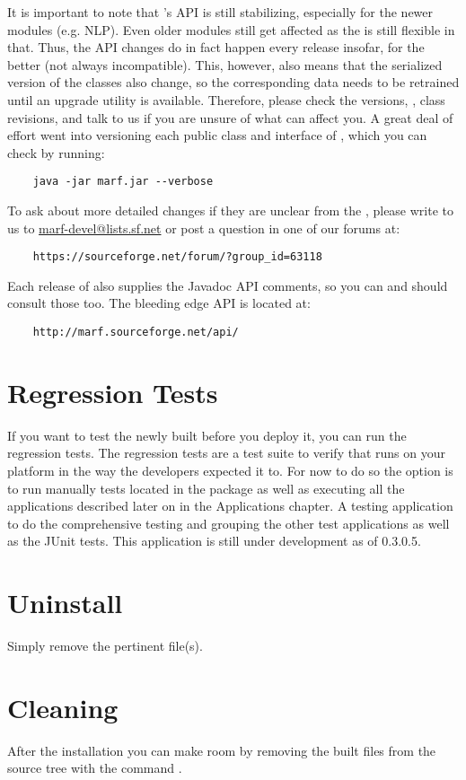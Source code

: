 It is important to note that {\marf}'s API is still stabilizing,
especially for the newer modules (e.g. NLP). Even older modules still
get affected as the {\marf} is still flexible in that. Thus,
the API changes do in fact happen every release insofar, for the
better (not always incompatible). This, however, also means that the serialized version
of the  classes also change, so the corresponding
data needs to be retrained until an upgrade utility is available.
Therefore, please check the versions, , class revisions,
and talk to us if you are unsure of what can affect you. A great
deal of effort went into versioning each public class and
interface of {\marf}, which you can check by running:

\begin{verbatim}
    java -jar marf.jar --verbose
\end{verbatim}

\noindent
To ask about more detailed changes if they are unclear from
the , please write to us to \url{marf-devel@lists.sf.net}
or post a question in one of our forums at:

\begin{verbatim}
    https://sourceforge.net/forum/?group_id=63118
\end{verbatim}

\noindent
Each release of {\marf} also supplies the Javadoc API comments,
so you can and should consult those too. The bleeding edge
API is located at:

\begin{verbatim}
    http://marf.sourceforge.net/api/
\end{verbatim}

\section{Regression Tests}

If you want to test the newly built {\marf} before you deploy it,
you can run the regression tests. The regression
tests are a test suite to verify that {\marf}
runs on your platform in the way the developers expected it to.
For now to do so the option is to run manually tests located
in the  package as well as executing
all the  applications described later on in
the Applications chapter. A  testing application
to do the comprehensive testing and grouping the other test
applications as well as the JUnit tests. This application is
still under development as of 0.3.0.5.

\section{Uninstall}

Simply remove the pertinent  file(s).

\section{Cleaning}

After the installation you can make room by removing the built
files from the source tree with the command .

